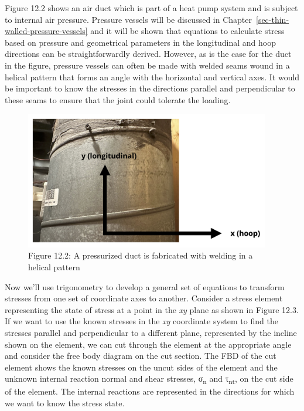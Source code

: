 \documentclass[
  letterpaper,
  DIV=11,
  numbers=noendperiod]{scrreprt}
\theoremstyle{definition}
\theoremstyle{remark}
\begin{document}
Figure 12.2 shows an air duct which is part of a heat pump system and is
subject to internal air pressure. Pressure vessels will be discussed in
Chapter~\ref{sec-thin-walled-pressure-vessels} and it will be shown that
equations to calculate stress based on pressure and geometrical
parameters in the longitudinal and hoop directions can be
straightforwardly derived. However, as is the case for the duct in the
figure, pressure vessels can often be made with welded seams wound in a
helical pattern that forms an angle with the horizontal and vertical
axes. It would be important to know the stresses in the directions
parallel and perpendicular to these seams to ensure that the joint could
tolerate the loading.

\begin{figure}[H]

{\centering \includegraphics[width=4.21875in,height=\textheight]{images/CH12 figures/figure 12.2.png}

}

\caption{Figure 12.2: A pressurized duct is fabricated with welding in a
helical pattern}

\end{figure}%

Now we'll use trigonometry to develop a general set of equations to
transform stresses from one set of coordinate axes to another. Consider
a stress element representing the state of stress at a point in the
\emph{xy} plane as shown in Figure 12.3. If we want to use the known
stresses in the \emph{xy} coordinate system to find the stresses
parallel and perpendicular to a different plane, represented by the
incline shown on the element, we can cut through the element at the
appropriate angle and consider the free body diagram on the cut section.
The FBD of the cut element shows the known stresses on the uncut sides
of the element and the unknown internal reaction normal and shear
stresses, σ\textsubscript{n} and τ\textsubscript{nt}, on the cut side of
the element. The internal reactions are represented in the directions
for which we want to know the stress state.
\end{document}
